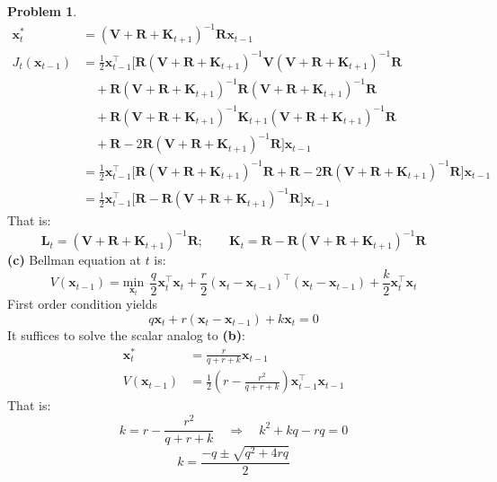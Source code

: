 \documentclass[a4paper, 8pt]{article}
\theoremstyle{definition}
\newtheorem{problem}{Problem}
\theoremstyle{hSol}
\begin{document}
\begin{problem}
\begin{equation}
\begin{split}
		\bm{x}_t^* &= (\bm{V}+\bm{R}+\bm{K}_{t+1})^{-1}\bm{Rx}_{t-1} \\
		J_t(\bm{x}_{t-1})&= \frac{1}{2} \bm{x}_{t-1}^{\top}\Big[\bm{R}(\bm{V}+\bm{R}+ \bm{K}_{t+1})^{-1}\bm{V}(\bm{V}+\bm{R}+ \bm{K}_{t+1})^{-1}\bm{R} \\
		&\quad+ \bm{R}(\bm{V}+\bm{R}+ \bm{K}_{t+1})^{-1}\bm{R}(\bm{V}+\bm{R}+ \bm{K}_{t+1})^{-1}\bm{R} \\
		&\quad+ \bm{R}(\bm{V}+\bm{R}+ \bm{K}_{t+1})^{-1}\bm{K}_{t+1}(\bm{V}+\bm{R}+ \bm{K}_{t+1})^{-1}\bm{R} \\
		&\quad+\bm{R} - 2\bm{R}(\bm{V}+\bm{R}+ \bm{K}_{t+1})^{-1}\bm{R}\Big] \bm{x}_{t-1}\\
		&=\frac{1}{2} \bm{x}_{t-1}^{\top}\Big[\bm{R}(\bm{V}+\bm{R}+ \bm{K}_{t+1})^{-1}\bm{R} + \bm{R} - 2\bm{R}(\bm{V}+\bm{R}+ \bm{K}_{t+1})^{-1}\bm{R}\Big] \bm{x}_{t-1}\\
		&=\frac{1}{2} \bm{x}_{t-1}^{\top}\Big[ \bm{R} - \bm{R}(\bm{V}+\bm{R}+ \bm{K}_{t+1})^{-1}\bm{R}\Big] \bm{x}_{t-1}
	\end{split}
\end{equation}
That is:
\begin{equation}
	\bm{L}_t = (\bm{V}+\bm{R}+\bm{K}_{t+1})^{-1}\bm{R};\qquad \bm{K}_t = \bm{R} - \bm{R}(\bm{V}+\bm{R}+ \bm{K}_{t+1})^{-1}\bm{R}
\end{equation}
\textbf{(c)} Bellman equation at $t$ is:
\begin{equation}
		V(\bm{x}_{t-1}) = \underset{\bm{x}_t}{\text{min}} ~~\frac{q}{2}\bm{x}_t^{\top}  \bm{x}_t + \frac{r}{2}(\bm{x}_t- \bm{x}_{t-1} )^{\top}(\bm{x}_t- \bm{x}_{t-1}) + \frac{k}{2}\bm{x}_{t}^{\top} \bm{x}_{t}
\end{equation}
First order condition yields
\begin{equation}
	q\bm{x}_t + r(\bm{x}_t - \bm{x}_{t-1}) + k \bm{x}_{t} = 0
\end{equation}
It suffices to solve the scalar analog to \textbf{(b)}:
\begin{equation}
	\begin{split}
		\bm{x}_t^* &= \frac{r}{q+r+k}\bm{x}_{t-1} \\
		V(\bm{x}_{t-1}) &=\frac{1}{2} \left(r - \frac{r^2}{q+r+k}\right)\bm{x}_{t-1}^{\top} \bm{x}_{t-1}
	\end{split}
\end{equation}
That is:
\begin{equation}
	k = r - \frac{r^2}{q+r+k} \quad \Rightarrow \quad k^2 + kq - rq = 0
\end{equation}
\begin{equation}
	k = \frac{-q \pm \sqrt{q^2 + 4rq}}{2}
\end{equation}
\end{problem}
\end{document}
